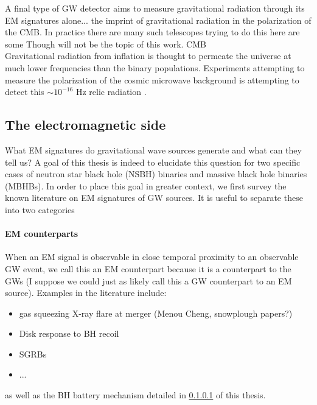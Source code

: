 A final type of GW detector aims to measure gravitational radiation through its EM signatures alone...
the imprint of gravitational radiation in the polarization of the CMB. In practice there are many such telescopes trying to do this here are some \citep{} Though will not be the topic of this work.
CMB\\
Gravitational radiation from inflation is thought to permeate the universe at much lower frequencies than the binary populations. Experiments attempting to measure the polarization of the cosmic microwave background is attempting to detect this $\sim 10^{-16}$ Hz relic radiation \citep{}.











\subsection{The electromagnetic side}
%
What EM signatures do gravitational wave sources generate and what can they tell us? A goal of this thesis is indeed to elucidate this question for two specific cases of neutron star black hole (NSBH) binaries and massive black hole binaries (MBHBs). In order to place this goal in greater context, we first survey the known literature on EM signatures of GW sources. It is useful to separate these into two categories

\paragraph{EM counterparts} When an EM signal is observable in close temporal proximity to an observable GW event, we call this an EM counterpart because it is a counterpart to the GWs (I suppose we could just as likely call this a GW counterpart to an EM source). Examples in the literature include:
\begin{itemize}
\item gas squeezing X-ray flare at merger (Menou Cheng, snowplough papers?)
\item Disk response to BH recoil
\item SGRBs
\item ...
\end{itemize}
as well as the BH battery mechanism detailed in \ref{} of this thesis.

